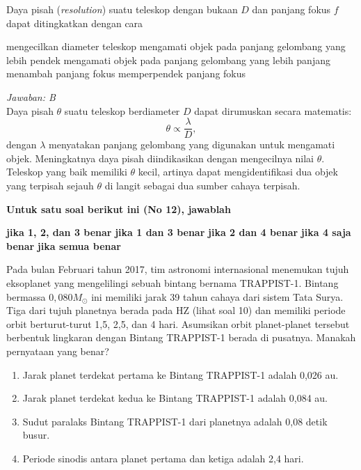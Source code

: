 \documentclass[11pt,fleqn]{exam}
\begin{document}
\begin{questions}
\vspace{0.3cm}
\question Daya pisah (\textit{resolution}) suatu teleskop dengan bukaan $D$ dan panjang fokus $f$ dapat ditingkatkan dengan cara
\begin{choices}
\choice mengecilkan diameter teleskop
\choice mengamati objek pada panjang gelombang yang lebih pendek
\choice mengamati objek pada panjang gelombang yang lebih panjang
\choice menambah panjang fokus
\choice memperpendek panjang fokus
\end{choices}

\textit{Jawaban: B}\\
Daya pisah $\theta$ suatu teleskop berdiameter $D$ dapat dirumuskan secara matematis:
$$\theta\propto\frac{\lambda}{D},$$ 
dengan $\lambda$ menyatakan panjang gelombang yang digunakan untuk mengamati objek. Meningkatnya daya pisah diindikasikan dengan mengecilnya nilai $\theta$. Teleskop yang baik memiliki $\theta$ kecil, artinya dapat mengidentifikasi dua objek yang terpisah sejauh $\theta$ di langit sebagai dua sumber cahaya terpisah.

\vspace{0.5cm}
\textbf{Untuk satu soal berikut ini (No 12), jawablah}
\begin{choices}
\choice \textbf{jika 1, 2, dan 3 benar}
\choice \textbf{jika 1 dan 3 benar}
\choice \textbf{jika 2 dan 4 benar}
\choice \textbf{jika 4 saja benar}
\choice \textbf{jika semua benar}
\end{choices}

\vspace{0.3cm}
\question Pada bulan Februari tahun 2017, tim astronomi internasional menemukan tujuh eksoplanet yang mengelilingi sebuah bintang bernama TRAPPIST-1. Bintang bermassa $0,080 M_{\odot}$ ini memiliki jarak 39 tahun cahaya dari sistem Tata Surya. Tiga dari tujuh planetnya berada pada HZ (lihat soal 10) dan memiliki periode orbit berturut-turut 1,5, 2,5, dan 4 hari. Asumsikan orbit planet-planet tersebut berbentuk lingkaran dengan Bintang TRAPPIST-1 berada di pusatnya. Manakah pernyataan yang benar?
\begin{enumerate}
\item Jarak planet terdekat pertama ke Bintang TRAPPIST-1 adalah 0,026 au.
\item Jarak planet terdekat kedua ke Bintang TRAPPIST-1 adalah 0,084 au.
\item Sudut paralaks Bintang TRAPPIST-1 dari planetnya adalah 0,08 detik busur.
\item Periode sinodis antara planet pertama dan ketiga adalah 2,4 hari.
\end{enumerate}


\end{questions}
\end{document}
